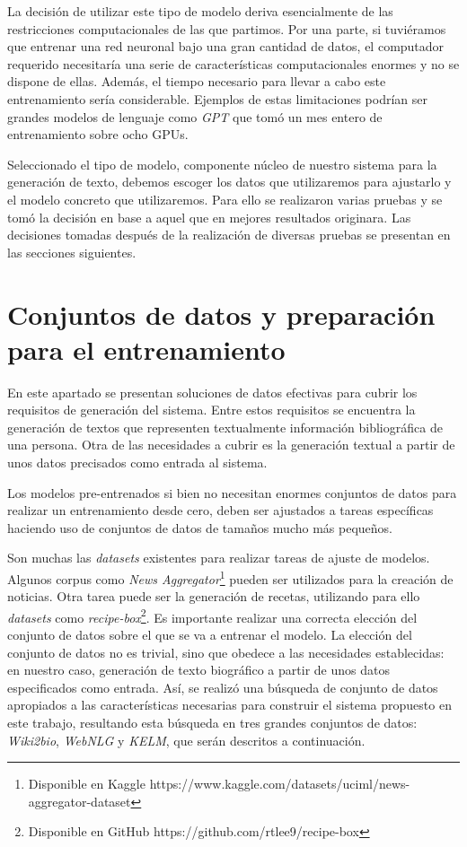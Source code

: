 La decisión de utilizar este tipo de modelo deriva esencialmente de las restricciones computacionales de las que partimos. Por una parte, si tuviéramos que entrenar una red neuronal bajo una gran cantidad de datos, el computador requerido necesitaría una serie de características computacionales enormes y no se dispone de ellas. Además, el tiempo necesario para llevar a cabo este entrenamiento sería considerable. Ejemplos de estas limitaciones podrían ser grandes modelos de lenguaje como \textit{GPT} que tomó un mes entero de entrenamiento sobre ocho GPUs. 

Seleccionado el tipo de modelo, componente núcleo de nuestro sistema para la generación de texto, debemos escoger los datos que utilizaremos para ajustarlo y el modelo concreto que utilizaremos. Para ello se realizaron varias pruebas y se tomó la decisión en base a aquel que en mejores resultados originara. Las decisiones tomadas después de la realización de diversas pruebas se presentan en las secciones siguientes.

\section{Conjuntos de datos y preparación para el entrenamiento}
\label{sec:ConjuntosDeDatosYPreparacionParaElEntrenamiento}

En este apartado se presentan soluciones de datos efectivas para cubrir los requisitos de generación del sistema. Entre estos requisitos se encuentra la generación de textos que representen textualmente información bibliográfica de una persona. Otra de las necesidades a cubrir es la generación textual a partir de unos datos precisados como entrada al sistema. 

Los modelos pre-entrenados si bien no necesitan enormes conjuntos de datos para realizar un entrenamiento desde cero, deben ser ajustados a tareas específicas haciendo uso de conjuntos de datos de tamaños mucho más pequeños.

Son muchas las \textit{datasets} existentes para realizar tareas de ajuste de modelos. Algunos corpus como \textit{News Aggregator}\footnote{Disponible en Kaggle https://www.kaggle.com/datasets/uciml/news-aggregator-dataset} pueden ser utilizados para la creación de noticias. Otra tarea puede ser la generación de recetas, utilizando para ello \textit{datasets} como \textit{recipe-box}\footnote{Disponible en GitHub https://github.com/rtlee9/recipe-box}.
Es importante realizar una correcta elección del conjunto de datos sobre el que se va a entrenar el modelo. La elección del conjunto de datos no es trivial, sino que obedece a las necesidades establecidas: en nuestro caso, generación de texto biográfico a partir de unos datos especificados como entrada. 
Así, se realizó una búsqueda de conjunto de datos apropiados a las características necesarias para construir el sistema propuesto en este trabajo, resultando esta búsqueda en tres grandes conjuntos de datos: \textit{Wiki2bio}, \textit{WebNLG} y \textit{KELM}, que serán descritos a continuación.



